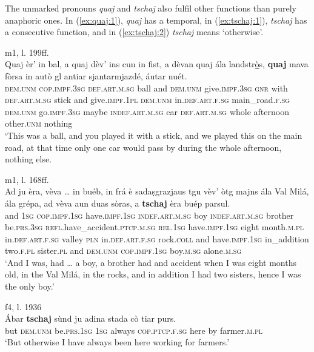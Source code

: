 The unmarked pronouns \textit{quaj} and \textit{tschaj}  also fulfil other functions than purely anaphoric ones. In (\ref{ex:quaj:1}), \textit{quaj} has a temporal, in (\ref{ex:tschaj:1}), \textit{tschaj} has a consecutive function, and in (\ref{ex:tschaj:2}) \textit{tschaj} means `otherwise'.

\ea\label{ex:quaj:1}
 {m1, l. 199ff.}\\
\gll    Quaj èr’ in bal, a quaj dèv’ ins cun in fist, a dèvan quaj ála  landstr\underline{ò}s, \textbf{quaj} mava fòrsa in autò gl antiar sjantarmjazdé, áutar nuét.\\
\textsc{dem.unm} \textsc{cop.impf.3sg} \textsc{def.art.m.sg} ball and \textsc{dem.unm} give.\textsc{impf.3sg} \textsc{gnr} with \textsc{def.art.m.sg} stick and give.\textsc{impf.1pl} \textsc{dem.unm} in.\textsc{def.art.f.sg} main\_road.\textsc{f.sg} \textsc{dem.unm} go.\textsc{impf.3sg} maybe \textsc{indef.art.m.sg} car \textsc{def.art.m.sg} whole afternoon other.\textsc{unm} nothing\\
\glt `This was a ball, and you played it with a stick, and we played this on the main road, at that time only one car would pass by during the whole afternoon, nothing else.
\z

\ea
\label{ex:tschaj:1}
 {m1, l. 168ff.}\\
\gll    Ad ju èra, vèva … in buéb, in frá è sadaṣgrazjaus tgu vèv’ òtg majns ála Val Milá, ála grépa, ad vèva aun duas sòras, a \textbf{tschaj} èra buép parsul. \\
and \textsc{1sg} \textsc{cop.impf.1sg} have.\textsc{impf.1sg} {} \textsc{indef.art.m.sg} boy \textsc{indef.art.m.sg} brother be.\textsc{prs.3sg} \textsc{refl}.have\_accident.\textsc{ptcp.m.sg} \textsc{rel.1sg} have.\textsc{impf.1sg} eight month.\textsc{m.pl} in.\textsc{def.art.f.sg} valley \textsc{pln} in.\textsc{def.art.f.sg} rock.\textsc{coll} and have.\textsc{impf.1sg} in\_addition two.\textsc{f.pl} sister.\textsc{pl} and \textsc{dem.unm}  \textsc{cop.impf.1sg} boy.\textsc{m.sg} alone.\textsc{m.sg}\\
\glt `And I was, had … a boy, a brother had and accident when I was eight months old, in the Val Milá, in the rocks, and in addition I had two sisters, hence I was the only boy.'
\z 

\ea
\label{ex:tschaj:2}
 {f4, l. 1936}\\
	\gll  Ábar \textbf{tschaj} sùnd ju adina stada cò tiar purs.\\
but \textsc{dem.unm} be.\textsc{prs.1sg} \textsc{1sg} always \textsc{cop.ptcp.f.sg} here by farmer.\textsc{m.pl}\\
\glt `But otherwise I have always been here working for farmers.'
\z

